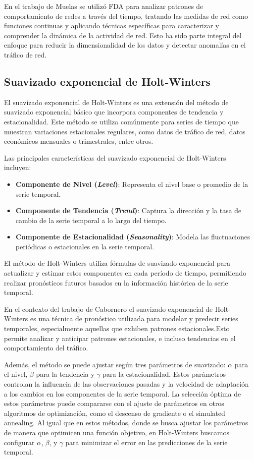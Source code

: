 En el trabajo de Muelas \cite{muelas2015} se utilizó FDA para analizar patrones de comportamiento de redes a través del tiempo, tratando las medidas de red como funciones continuas y aplicando técnicas específicas para caracterizar y comprender la dinámica de la actividad de red. Esto ha sido parte integral del enfoque para reducir la dimensionalidad de los datos y detectar anomalías en el tráfico de red.

\subsection{Suavizado exponencial de Holt-Winters} %
El suavizado exponencial de Holt-Winters es una extensión del método de suavizado exponencial básico que incorpora componentes de tendencia y estacionalidad. Este método se utiliza comúnmente para series de tiempo que muestran variaciones estacionales regulares, como datos de tráfico de red, datos económicos mensuales o trimestrales, entre otros.

Las principales características del suavizado exponencial de Holt-Winters incluyen:
\begin{itemize}
    \item \textbf{Componente de Nivel (\textit{Level})}: Representa el nivel base o promedio de la serie temporal.
    \item \textbf{Componente de Tendencia (\textit{Trend})}: Captura la dirección y la tasa de cambio de la serie temporal a lo largo del tiempo.
    \item \textbf{Componente de Estacionalidad (\textit{Seasonality})}: Modela las fluctuaciones periódicas o estacionales en la serie temporal.
\end{itemize}
El método de Holt-Winters utiliza fórmulas de suavizado exponencial para actualizar y estimar estos componentes en cada período de tiempo, permitiendo realizar pronósticos futuros basados en la información histórica de la serie temporal. 

En el contexto del trabajo de Cabornero \cite{cabornero2021} el suavizado exponencial de Holt-Winters es una técnica de pronóstico utilizada para modelar y predecir series temporales, especialmente aquellas que exhiben patrones estacionales.Esto permite analizar y anticipar patrones estacionales, e incluso tendencias en el comportamiento del tráfico.

Además, el método se puede ajustar según tres parámetros de suavizado: $\alpha$ para el nivel, $\beta$ para la tendencia y $\gamma$ para la estacionalidad. Estos parámetros controlan la influencia de las observaciones pasadas y la velocidad de adaptación a los cambios en los componentes de la serie temporal. La selección óptima de estos parámetros puede compararse con el ajuste de parámetros en otros algoritmos de optimización, como el descenso de gradiente o el simulated annealing. Al igual que en estos métodos, donde se busca ajustar los parámetros de manera que optimicen una función objetivo, en Holt-Winters buscamos configurar $\alpha$, $\beta$, y $\gamma$ para minimizar el error en las predicciones de la serie temporal.

